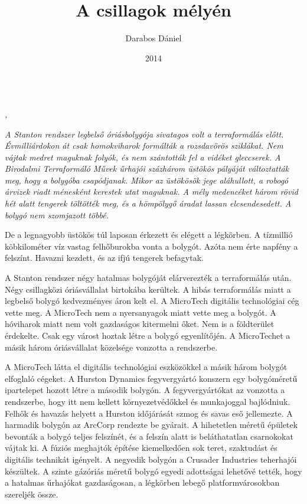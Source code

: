 \documentclass[10pt]{memoir}
\author{Darabos Dániel}
\date{2014}
\title{A csillagok mélyén}
\begin{document}
\begin{titlingpage}
  \centering
  \vspace*{0.2\textheight}
  {\Huge \thetitle}\\[\baselineskip]
  {\large\itshape \theauthor, \thedate}
\end{titlingpage}

\vspace*{0.4\textheight}

\itshape
\noindent
A Stanton rendszer legbelső óriásbolygója sivatagos volt a terraformálás előtt.
Évmilliárdokon át csak homokviharok formálták a rozsdavörös sziklákat. Nem
vájtak medret maguknak folyók, és nem szántották fel a vidéket gleccserek. A
Birodalmi Terraformáló Művek űrhajói százhárom üstökös pályáját változtatták
meg, hogy a bolygóba csapódjanak. Mikor az üstökösök jege aláhullott, a robogó
árvizek riadt ménesként kerestek utat maguknak. A mély medencéket három rövid
hét alatt tengerek töltötték meg, és a hömpölygő áradat lassan elcsendesedett.
A bolygó nem szomjazott többé.

De a legnagyobb üstökös túl laposan érkezett és elégett a légkörben. A
tízmillió köbkilométer víz vastag felhőburokba vonta a bolygót. Azóta nem érte
napfény a felszínt. Havazni kezdett, és az ifjú tengerek befagytak.

A Stanton rendszer négy hatalmas bolygóját elárverezték a terraformálás után.
Négy csillagközi óriásvállalat birtokába kerültek. A hibás terraformálás miatt
a legbelső bolygó kedvezményes áron kelt el. A MicroTech digitális technológiai
cég vette meg. A MicroTech nem a nyersanyagok miatt vette meg a bolygót. A
hóviharok miatt nem volt gazdaságos kitermelni őket. Nem is a földterület
érdekelte. Csak egy várost hoztak létre a bolygó egyenlítőjén. A MicroTechet a
másik három óriásvállalat közelsége vonzotta a rendszerbe.

A MicroTech látta el digitális technológiai eszközökkel a másik három bolygót
elfoglaló cégeket. A Hurston Dynamics fegyvergyártó konszern egy bolygóméretű
ipartelepet hozott létre a második bolygón. A fegyvergyártókat az vonzotta a
rendszerbe, hogy itt nem kellett környezetvédőkkel és munkajoggal bajlódniuk.
Felhők és havazás helyett a Hurston időjárását szmog és savas eső jellemezte. A
harmadik bolygón az ArcCorp rendezte be gyárait. A hihetetlen méretű épületek
bevonták a bolygó teljes felszínét, és a felszín alatt is beláthatatlan
csarnokokat vájtak ki. A fúziós meghajtók építése kiemelkedően sok teret,
szaktudást és digitális technikát igényelt. A negyedik bolygón a Crusader
Industries teherhajói készültek. A szinte gázóriás méretű bolygó egyedi
adottságai lehetővé tették, hogy a hatalmas űrhajókat gazdaságosan, a légkörben
lebegő platformvárosokban szereljék össze.
\end{document}
